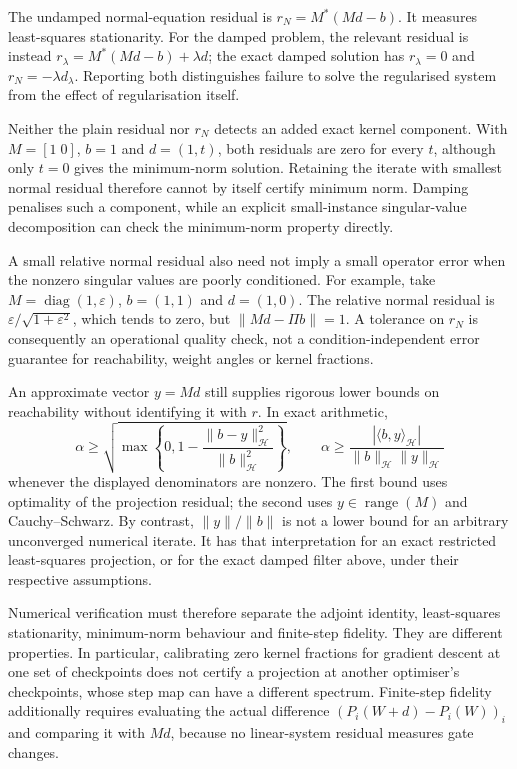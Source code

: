 \documentclass{article}
\theoremstyle{definition}
\theoremstyle{remark}
\begin{document}
The undamped normal-equation residual is
$r_N=M^*(Md-b)$. It measures least-squares stationarity. For the damped problem, the relevant residual is instead
$r_\lambda=M^*(Md-b)+\lambda d$; the exact damped solution has $r_\lambda=0$ and $r_N=-\lambda d_\lambda$. Reporting both distinguishes failure to solve the regularised system from the effect of regularisation itself.

Neither the plain residual nor $r_N$ detects an added exact kernel component. With $M=[1\;0]$, $b=1$ and $d=(1,t)$, both residuals are zero for every $t$, although only $t=0$ gives the minimum-norm solution. Retaining the iterate with smallest normal residual therefore cannot by itself certify minimum norm. Damping penalises such a component, while an explicit small-instance singular-value decomposition can check the minimum-norm property directly.

A small relative normal residual also need not imply a small operator error when the nonzero singular values are poorly conditioned. For example, take $M=\operatorname{diag}(1,\varepsilon)$, $b=(1,1)$ and $d=(1,0)$. The relative normal residual is $\varepsilon/\sqrt{1+\varepsilon^2}$, which tends to zero, but $\|Md-\Pi b\|=1$. A tolerance on $r_N$ is consequently an operational quality check, not a condition-independent error guarantee for reachability, weight angles or kernel fractions.

An approximate vector $y=Md$ still supplies rigorous lower bounds on reachability without identifying it with $r$. In exact arithmetic,
\begin{equation}
 \alpha\ge
 \sqrt{\max\left\{0,1-\frac{\|b-y\|_{\mathcal H}^2}{\|b\|_{\mathcal H}^2}\right\}},
 \qquad
 \alpha\ge\frac{|\langle b,y\rangle_{\mathcal H}|}
                   {\|b\|_{\mathcal H}\|y\|_{\mathcal H}}
 \label{eq:app-reach-bound}
\end{equation}
whenever the displayed denominators are nonzero. The first bound uses optimality of the projection residual; the second uses $y\in\operatorname{range}(M)$ and Cauchy--Schwarz. By contrast, $\|y\|/\|b\|$ is not a lower bound for an arbitrary unconverged numerical iterate. It has that interpretation for an exact restricted least-squares projection, or for the exact damped filter above, under their respective assumptions.

Numerical verification must therefore separate the adjoint identity, least-squares stationarity, minimum-norm behaviour and finite-step fidelity. They are different properties. In particular, calibrating zero kernel fractions for gradient descent at one set of checkpoints does not certify a projection at another optimiser's checkpoints, whose step map can have a different spectrum. Finite-step fidelity additionally requires evaluating the actual difference $(P_i(W+d)-P_i(W))_i$ and comparing it with $Md$, because no linear-system residual measures gate changes.
\end{document}
